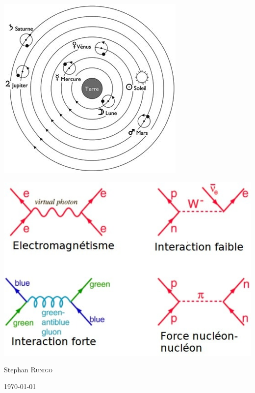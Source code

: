 \begin{titlepage}
\begin{minipage}{0.45\textwidth}
\begin{center}
\includegraphics[scale=0.30]{./presentation/ptoleme}
\end{center}
\end{minipage}
\begin{minipage}{0.45\textwidth}
\begin{center}
\includegraphics[scale=0.3]{./presentation/diagrammesInteractions}
\end{center}

\end{minipage}

\vfill

\begin{minipage}{0.4\textwidth}
\begin{flushleft} \large
\end{flushleft}
\end{minipage}
\begin{minipage}{0.4\textwidth}
\begin{flushright} \large
Stephan \textsc{Runigo}
\end{flushright}
\end{minipage}

\vfill

{\large \today}

\end{titlepage}
